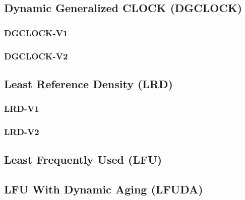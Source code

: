     

\subsection[DGCLOCK]{Dynamic Generalized CLOCK (DGCLOCK)} \label{subsec:dgclock}

    

\subsubsection{DGCLOCK-V1} \label{subsubsec:dgclock-v1}

    

\subsubsection{DGCLOCK-V2} \label{subsubsec:dgclock-v2}

    

\subsection[LRD]{Least Reference Density (LRD)} \label{subsec:lrd}

    

\subsubsection{LRD-V1} \label{subsubsec:lrd-v1}

    

\subsubsection{LRD-V2} \label{subsubsec:lrd-v2}

    

\subsection[LFU]{Least Frequently Used (LFU)} \label{subsec:lfu}

    

\subsection[LFUDA]{LFU With Dynamic Aging (LFUDA)} \label{subsec:lfuda}

    


